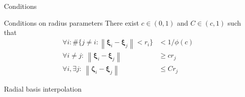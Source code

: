 \documentclass[aspectratio=169, xcolor={svgnames}]{beamer}
\begin{document}
\begin{frame}{Conditions}
\begin{block}{Conditions on radius parameters}
There exist $c \in (0, 1)$ and $C \in (c, 1)$ such that
\begin{align}
    \forall i: \# \{j \neq i: \left\| \boldsymbol{\xi}_i - \boldsymbol{\xi}_j \right\| < r_i \} &< 1 / \phi(c) \label{con:support-condition}  \tag{Condition 1} \\
    \forall i \neq j:~\left\| \boldsymbol{\xi}_i - \boldsymbol{\xi}_j \right\| &\geq c r_j \label{con:c-condition}  \tag{Condition 2}  \\
    \forall i, \exists j:~\left\| \boldsymbol{\zeta}_i - \boldsymbol{\xi}_j \right\| &\leq C r_j \label{con:C-condition}  \tag{Condition 3} 
\end{align}
\end{block}
\centering

 
 
\end{frame}

\begin{frame}{Radial basis interpolation}
\end{frame}
\end{document}
